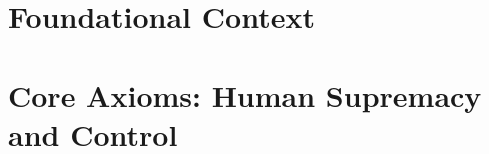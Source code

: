 \documentclass[12pt,a4paper,twoside,openright]{book}
\begin{document}
\cleardoublepage

\cleardoublepage
\pagestyle{plain}
\tableofcontents

\cleardoublepage
\listoffigures

\cleardoublepage
\listoftables

\mainmatter
\pagestyle{fancy}

\part{Foundational Context}








\part{Core Axioms: Human Supremacy and Control}






\end{document}
